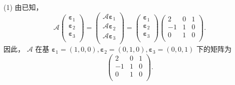 \begin{enumerate}[1~]
\begin{solution}
(1) 由已知，\[
\mathscr{A} \left( \begin{array}{c}
	\boldsymbol{\varepsilon} _1\\
	\boldsymbol{\varepsilon} _2\\
	\boldsymbol{\varepsilon} _3\\
\end{array} \right) = \left( \begin{array}{c}
	\mathscr{A}\boldsymbol{\varepsilon} _1\\
	\mathscr{A}\boldsymbol{\varepsilon} _2\\
	\mathscr{A}\boldsymbol{\varepsilon} _3\\
\end{array} \right) =\left( \begin{array}{c}
	\boldsymbol{\varepsilon} _1\\
	\boldsymbol{\varepsilon} _2\\
	\boldsymbol{\varepsilon} _3\\
\end{array} \right) \left( \begin{matrix}
	2&		0&		1\\
	-1&		1&		0\\
	0&		1&		0\\
\end{matrix} \right) .
\]
因此， $\mathscr { A }$ 在基 $\boldsymbol{\varepsilon} _ { 1 } = ( 1,0,0 ) , \boldsymbol{\varepsilon} _ { 2 } = ( 0,1,0 ) , \boldsymbol{\varepsilon} _ { 3 } = ( 0,0,1 )$ 下的矩阵为 
$$
\left( \begin{matrix}
	2&		0&		1\\
	-1&		1&		0\\
	0&		1&		0\\
\end{matrix} \right).
$$


\end{solution}
\end{enumerate}

